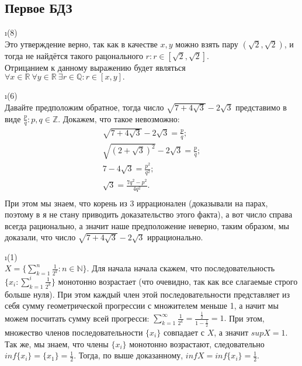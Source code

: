 \subsection{Первое БДЗ}

\i(8)\\
Это утверждение верно, так как в качестве $x, y$ можно взять пару $(\sqrt{2}, \sqrt{2})$, и тогда не найдётся такого рацонального $r: r \in [\sqrt{2}, \sqrt{2}]$.\\
Отрицанием к данному выражению будет являться $\forall x \in \mathds{R} \ \forall y \in \mathds{R} \ \exists r \in \mathds{Q}: r \in [x, y].$

\i(6)\\
Давайте предположим обратное, тогда число $\sqrt{7+4\sqrt{3}} - 2\sqrt{3}$ представимо в виде $\frac{p}{q}: p, q \in \mathds{Z}$. Докажем, что такое невозможно:
\begin{gather*}
    \sqrt{7+4\sqrt{3}} - 2\sqrt{3} = \frac{p}{q};\\
    \sqrt{(2+\sqrt{3})^2} - 2\sqrt{3} = \frac{p}{q};\\
    7 - 4\sqrt{3} = \frac{p^2}{q^2};\\
    \sqrt{3} = \frac{7q^2-p^2}{4q^2}.\\
\end{gather*}
При этом мы знаем, что корень из 3 иррационален (доказывали на парах, поэтому в я не стану приводить доказательство этого факта), а вот число справа всегда рационально, а значит наше предположение неверно, таким образом, мы доказали, что число $\sqrt{7+4\sqrt{3}} - 2\sqrt{3}$ иррационально.

\i (1)\\
$X = \{\sum\limits_{k=1}^n\frac{1}{2^k}: n \in \mathds{N}\}$. Для начала начала скажем, что последовательность $\{x_i:\sum\limits_{k=1}^i\frac{1}{2^k}\}$ монотонно возрастает (что очевидно, так как все слагаемые строго больше нуля). При этом каждый член этой последовательности представляет из себя сумму геометрической прогрессии с множителем меньше 1, а начит мы можем посчитать сумму всей прогресси: $\sum\limits_{k=1}^{\infty}\frac{1}{2^k} = \frac{\frac{1}{2}}{1-\frac{1}{2}} = 1.$ При этом, множество членов последовательности $\{x_i\}$ совпадает с $X$, а значит $supX = 1$. Так же, мы знаем, что члены $\{x_i\}$ монотонно возрастают, следовательно $inf\{x_i\} = \{x_1\} = \frac{1}{2}$. Тогда, по выше доказанному, $infX = inf\{x_i\} = \frac{1}{2}$. 

